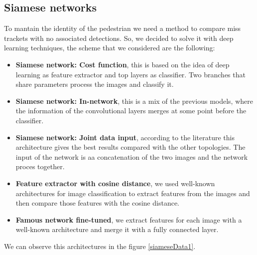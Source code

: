 \subsection{Siamese networks}\label{exper:entrenar}


To mantain the identity of the pedestrian we need a method to compare miss trackets with no associated detections. So, we decided to solve it with deep learning techniques, the scheme that we considered are the following:


\begin{itemize}


\item \textbf{Siamese network: Cost function}, this is based on the idea of deep learning as feature extractor and top layers as classifier. Two branches that share parameters process the images and classify it.

\item \textbf{Siamese network: In-network}, this is a mix of the previous models, where the information of the convolutional layers merges at some point before the classifier.

\item \textbf{Siamese network: Joint data input}, according to the literature this architecture gives the best results compared with the other topologies. The input of the network is aa concatenation of the two images and the network proces together.


\item \textbf{Feature extractor with cosine distance}, we used well-known architectures for image classification to extract features from the images and then compare those features with the cosine distance.

\item \textbf{Famous network fine-tuned}, we extract features for each image with a well-known architecture and merge it with a fully connected layer.

\end{itemize}

We can observe this architectures in the figure \ref{siameseData1}.

